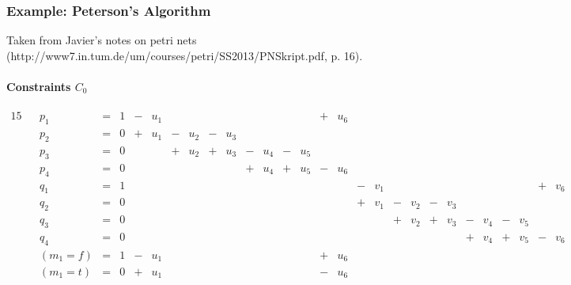 \documentclass{article}
\begin{document}
\subsubsection{Example: Peterson's Algorithm}

Taken from Javier's notes on petri nets
(http://www7.in.tum.de/um/courses/petri/SS2013/PNSkript.pdf, p. 16).

\paragraph{Constraints $C_0$}

\begin{alignat*}{15}
&& p_1 &{}={}& 1
  &{}-{}& u_1 &     &     &     &     &     &     &     &     &{}+{}& u_6 
  &     &     &     &     &     &     &     &     &     &     &     &     \\
&& p_2 &{}={}& 0
  &{}+{}& u_1 &{}-{}& u_2 &{}-{}& u_3 &     &     &     &     &     &     
  &     &     &     &     &     &     &     &     &     &     &     &     \\
&& p_3 &{}={}& 0
  &     &     &{}+{}& u_2 &{}+{}& u_3 &{}-{}& u_4 &{}-{}& u_5 &     &     
  &     &     &     &     &     &     &     &     &     &     &     &     \\
&& p_4 &{}={}& 0
  &     &     &     &     &     &     &{}+{}& u_4 &{}+{}& u_5 &{}-{}& u_6
  &     &     &     &     &     &     &     &     &     &     &     &     \\
&& q_1 &{}={}& 1
  &     &     &     &     &     &     &     &     &     &     &     &     
  &{}-{}& v_1 &     &     &     &     &     &     &     &     &{}+{}& v_6 \\
&& q_2 &{}={}& 0
  &     &     &     &     &     &     &     &     &     &     &     &    
  &{}+{}& v_1 &{}-{}& v_2 &{}-{}& v_3 &     &     &     &     &     &     \\
&& q_3 &{}={}& 0
  &     &     &     &     &     &     &     &     &     &     &     &     
  &     &     &{}+{}& v_2 &{}+{}& v_3 &{}-{}& v_4 &{}-{}& v_5 &     &     \\
&& q_4 &{}={}& 0
  &     &     &     &     &     &     &     &     &     &     &     &     
  &     &     &     &     &     &     &{}+{}& v_4 &{}+{}& v_5 &{}-{}& v_6 \\
&& (m_1=f) &{}={}& 1
  &{}-{}& u_1 &     &     &     &     &     &     &     &     &{}+{}& u_6     
  &     &     &     &     &     &     &     &     &     &     &     &     \\
&& (m_1=t) &{}={}& 0
  &{}+{}& u_1 &     &     &     &     &     &     &     &     &{}-{}& u_6     

\end{alignat*}
\end{document}

